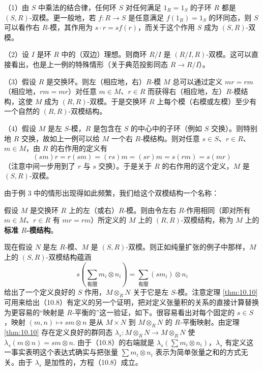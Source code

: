 \begin{example}
（1）由 \(S\) 中乘法的结合律，任何环 \(S\) 对任何满足 \(1_R = 1_S\) 的子环 \(R\) 都是 \((S, R)\)-双模。更一般地，若 \(f : R \to S\) 是任意满足 \(f(1_R) = 1_S\) 的环同态，则 \(S\) 可以看作右 \(R\)-模，其作用为 \(s \cdot r = sf(r)\)，而关于这个作用 \(S\) 成为 \((S, R)\)-双模。

（2）设 \(I\) 是环 \(R\) 中的（双边）理想。则商环 \(R/I\) 是 \((R/I, R)\)-双模。这可以直接看出，也是上一例的特殊情形（关于典范投影同态 \(R \to R/I\)）。

（3）假设 \(R\) 是交换环。则左（相应地，右）\(R\)-模 \(M\) 总可以通过定义 \(mr = rm\)（相应地，\(rm = mr\)）对任意 \(m \in M\)、\(r \in R\) 而获得右（相应地，左）\(R\)-模结构，这使 \(M\) 成为 \((R, R)\)-双模。于是交换环 \(R\) 上每个模（右模或左模）至少有一个自然的 \((R, R)\)-双模结构。

（4）假设 \(M\) 是左 \(S\)-模，\(R\) 是包含在 \(S\) 的中心中的子环（例如 \(S\) 交换）。则特别地 \(R\) 交换，故如上一例可以给 \(M\) 一个右 \(R\)-模结构。则对任意 \(s \in S\)、\(r \in R\)、\(m \in M\)，由 \(R\) 的右作用的定义有
\[
(sm)r = r(sm) = (rs)m = (sr)m = s(rm) = s(mr)
\]
（注意中间一步用到了 \(r\) 与 \(s\) 交换）。于是关于 \(R\) 的右作用的这个定义，\(M\) 是 \((S, R)\)-双模。
\end{example}

由于例 3 中的情形出现得如此频繁，我们给这个双模结构一个名称：

\begin{definition}
假设 \(M\) 是交换环 \(R\) 上的左（或右）\(R\)-模。则由令左右 \(R\)-作用相同（即对所有 \(m \in M\)、\(r \in R\) 有 \(mr = rm\)）所定义的 \(M\) 上的 \((R, R)\)-双模结构，称为 \(M\) 上的\textbf{标准 \(R\)-模结构}。
\end{definition}

现在假设 \(N\) 是左 \(R\)-模、\(M\) 是 \((S, R)\)-双模。则正如纯量扩张的例子中那样，\(M\) 上的 \((S, R)\)-双模结构蕴涵
\begin{equation}
s\left(\sum_{\text{有限}} m_i \otimes n_i\right) = \sum_{\text{有限}} (sm_i) \otimes n_i \tag{10.8}
\end{equation}
给出了一个定义良好的 \(S\) 作用，\(M \otimes_R N\) 关于它是左 \(S\)-模。注意定理 \ref{thm:10.10} 可用来给出（10.8）有定义的另一个证明，把对定义张量积的关系的直接计算替换为更容易的“映射是 \(R\)-平衡的”这一验证，如下。很容易看出对每个固定的 \(s \in S\)，映射 \((m, n) \mapsto sm \otimes n\) 是从 \(M \times N\) 到 \(M \otimes_R N\) 的 \(R\)-平衡映射。由定理 \ref{thm:10.10} 存在定义良好的群同态 \(\lambda_s : M \otimes_R N \to M \otimes_R N\) 使 \(\lambda_s(m \otimes n) = sm \otimes n\). 由于（10.8）的右端就是 \(\lambda_s(\sum m_i \otimes n_i)\)，\(\lambda_s\) 有定义这一事实表明这个表达式确实与把张量 \(\sum m_i \otimes n_i\) 表示为简单张量之和的方式无关。由于 \(\lambda_s\) 是加性的，方程（10.8）成立。


